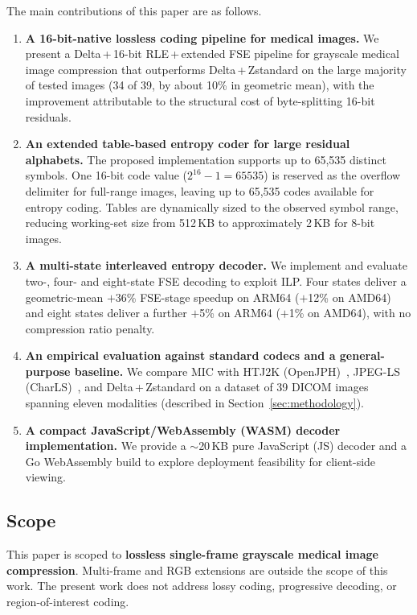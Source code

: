 \documentclass[journal]{IEEEtran}
\begin{document}
The main contributions of this paper are as follows.

\begin{enumerate}
  \item \textbf{A 16-bit-native lossless coding pipeline for medical images.}
  We present a Delta\,+\,16-bit RLE\,+\,extended FSE pipeline for grayscale
  medical image compression that outperforms Delta\,+\,Zstandard on the large
  majority of tested images (34 of 39, by about 10\% in geometric mean), with
  the improvement attributable to the structural cost of byte-splitting 16-bit
  residuals.

  \item \textbf{An extended table-based entropy coder for large residual
  alphabets.}
  The proposed implementation supports up to 65,535 distinct symbols.
  One 16-bit code value ($2^{16}-1 = 65535$) is reserved as the overflow
  delimiter for full-range images, leaving up to 65,535 codes available for
  entropy coding. Tables are dynamically sized to the observed symbol range,
  reducing working-set size from 512\,KB to approximately 2\,KB for 8-bit
  images.

  \item \textbf{A multi-state interleaved entropy decoder.}
  We implement and evaluate two-, four- and eight-state FSE decoding to
  exploit ILP. Four states deliver a geometric-mean $+$36\% FSE-stage
  speedup on ARM64 ($+$12\% on AMD64) and eight states deliver a further
  $+$5\% on ARM64 ($+$1\% on AMD64), with no compression ratio penalty.

  \item \textbf{An empirical evaluation against standard codecs and a
  general-purpose baseline.}
  We compare MIC with HTJ2K (OpenJPH)~\cite{openjph}, JPEG-LS
  (CharLS)~\cite{charls}, and Delta\,+\,Zstandard on a dataset of 39
  DICOM images spanning eleven modalities (described in
  Section~\ref{sec:methodology}).

  \item \textbf{A compact JavaScript/WebAssembly (WASM) decoder implementation.}
  We provide a ${\sim}$20\,KB pure JavaScript (JS) decoder and a Go
  WebAssembly build to explore deployment feasibility for client-side viewing.
\end{enumerate}

\subsection{Scope}

This paper is scoped to \textbf{lossless single-frame grayscale medical image
compression}. Multi-frame and RGB extensions are outside the scope of this
work. The present work does not address lossy coding, progressive decoding, or
region-of-interest coding.
\end{document}
